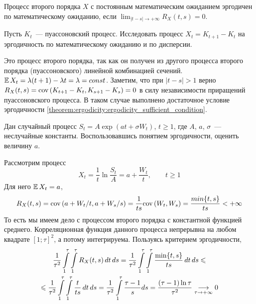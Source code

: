 \begin{theorem}
    \label{theorem:ergodicity:ergodicity_sufficient_condition}
    Процесс второго порядка $ X $ с постоянным математическим ожиданием эргодичен по математическому ожиданию,
    если $ \displaystyle \lim_{|t - s| \to +\infty} R_X(t, s) = 0 $.
\end{theorem}


\begin{exercise}
    \label{exercise:ergodicity:Poisson}
    Пусть $ K_t $~--- пуассоновский процесс.
    Исследовать процесс $ X_t = K_{t+1} - K_t $ на эргодичность по математическому ожиданию и по дисперсии.
\end{exercise}

\begin{solution}
    Это процесс второго порядка, так как он получен из другого процесса второго порядка (пуассоновского) линейной комбинацией сечений.
    $ \operatorname{\mathbb{E}} X_t = \lambda (t + 1) - \lambda t = \lambda = const $.
    Заметим, что при $ |t - s| > 1 $ верно $ R_X(t, s) = \textnormal{cov}\left(K_{t+1} - K_t, K_{s+1} - K_s\right) = 0 $
    в силу независимости приращений пуассоновского процесса.
    В таком случае выполнено достаточное условие эргодичности \ref{theorem:ergodicity:ergodicity_sufficient_condition}.
\end{solution}


\begin{exercise}
    \label{exercise:ergodicity:exp_process}
    Дан случайный процесс $ S_t = A \exp(at + \sigma W_t) $, $ t \geqslant 1 $,
    где $ A $, $ a $, $ \sigma $~--- неслучайные константы.
    Воспользовавшись понятием эргодичности, оценить величину $ a $.
\end{exercise}

\begin{solution}
    Рассмотрим процесс
    \[
        X_t = \frac{1}{t} \ln \frac{S_t}{A} = a + \frac{W_t}{t}, \qquad t \geqslant 1
    \]
    Для него $ \operatorname{\mathbb{E}} X_t = a $,
    \[
        R_X(t, s) = \textnormal{cov}\left(a + W_t / t, a + W_s / s\right) = \frac{1}{t s} \textnormal{cov}\left(W_t, W_s\right) = \frac{min\{t, s\}}{t s} < +\infty
    \]
    То есть мы имеем дело с процессом второго порядка с константной функцией среднего.
    Корреляционная функция данного процесса непрерывна на любом квадрате $ [1;\tau]^2 $,
    а потому интегрируема.
    Пользуясь критерием эргодичности,
    \begin{multline*}
        \frac{1}{\tau^2} \int\limits_1^\tau \int\limits_1^\tau R_X(t,s) \, dt \, ds =
        \frac{1}{\tau^2} \int\limits_1^\tau \int\limits_1^\tau \frac{\min\{t, s\}}{t s} \, dt \, ds \leqslant \\ \leqslant
        \frac{1}{\tau^2} \int\limits_1^\tau \int\limits_1^\tau \frac{t}{t s} \, dt \, ds =
        \frac{1}{\tau^2} \int\limits_1^\tau \frac{\tau - 1}{s} ds = \frac{(\tau - 1) \ln \tau}{\tau^2} \underset{\tau \to +\infty}{\longrightarrow} 0
    \end{multline*}
\end{solution}
